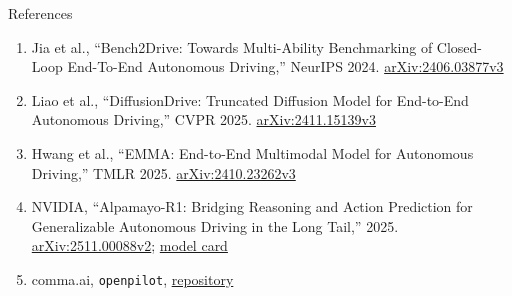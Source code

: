 \begin{frame}[allowframebreaks=0.9]{References}
\begin{enumerate}
    \item Jia et al., ``Bench2Drive: Towards Multi-Ability Benchmarking of Closed-Loop End-To-End Autonomous Driving,'' NeurIPS 2024. \href{https://arxiv.org/abs/2406.03877v3}{arXiv:2406.03877v3}
    \item Liao et al., ``DiffusionDrive: Truncated Diffusion Model for End-to-End Autonomous Driving,'' CVPR 2025. \href{https://arxiv.org/abs/2411.15139v3}{arXiv:2411.15139v3}
    \item Hwang et al., ``EMMA: End-to-End Multimodal Model for Autonomous Driving,'' TMLR 2025. \href{https://arxiv.org/abs/2410.23262v3}{arXiv:2410.23262v3}
    \item NVIDIA, ``Alpamayo-R1: Bridging Reasoning and Action Prediction for Generalizable Autonomous Driving in the Long Tail,'' 2025. \href{https://arxiv.org/abs/2511.00088v2}{arXiv:2511.00088v2}; \href{https://huggingface.co/nvidia/Alpamayo-R1-10B}{model card}
    \item comma.ai, \texttt{openpilot}, \href{https://github.com/commaai/openpilot}{repository}
  \end{enumerate}
\end{frame}
